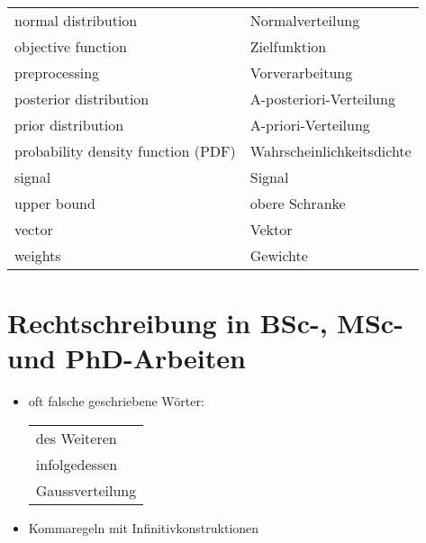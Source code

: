 \documentclass{mlthesis}
\begin{document}
\begin{center}
\begin{tabular}{|l|l|}
    normal distribution                & Normalverteilung          \\
    objective function                 & Zielfunktion              \\
    preprocessing                      & Vorverarbeitung           \\
    posterior distribution             & A-posteriori-Verteilung   \\
    prior distribution                 & A-priori-Verteilung       \\
    probability density function (PDF) & Wahrscheinlichkeitsdichte \\
    signal                             & Signal                    \\
    upper bound                        & obere Schranke            \\
    vector                             & Vektor                    \\
    weights                            & Gewichte  \\
    \hline
  \end{tabular}
\end{center}

\section{Rechtschreibung in BSc-, MSc- und PhD-Arbeiten}

\begin{itemize}
\item oft falsche geschriebene Wörter:
  \begin{center}
    \begin{tabular}{|l|}
      \hline
      des Weiteren  \\
      infolgedessen   \\
      Gaussverteilung  \\\hline
    \end{tabular}
  \end{center}
\item Kommaregeln mit Infinitivkonstruktionen
\end{itemize}
\end{document}
